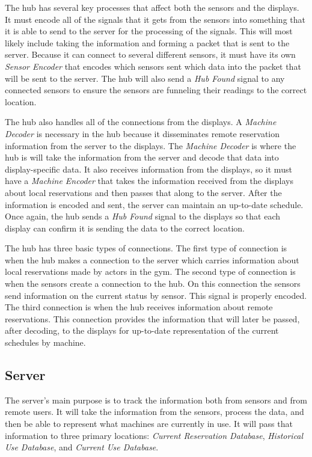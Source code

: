 \documentclass[PPFS.tex]{template/subfiles}
\newcommand{\sn}[1]{\textit{#1}}
\begin{document}
The hub has several key processes that affect both the sensors and the displays. It must encode all of the signals that it gets from the sensors into something that it is able to send to the server for the processing of the signals. This will most likely include taking the information and forming a packet that is sent to the server. Because it can connect to several different sensors, it must have its own \sn{Sensor Encoder} that encodes which sensors sent which data into the packet that will be sent to the server. The hub will also send a \sn{Hub Found} signal to any connected sensors to ensure the sensors are funneling their readings to the correct location.

The hub also handles all of the connections from the displays. A \sn{Machine Decoder} is necessary in the hub because it disseminates remote reservation information from the server to the displays. The \sn{Machine Decoder} is where the hub is will take the information from the server and decode that data into display-specific data. It also receives information from the displays, so it must have a \sn{Machine Encoder} that takes the information received from the displays about local reservations and then passes that along to the server. After the information is encoded and sent, the server can maintain an up-to-date schedule. Once again, the hub sends a \sn{Hub Found} signal to the displays so that each display can confirm it is sending the data to the correct location.

The hub has three basic types of connections. The first type of connection is when the hub makes a connection to the server which carries information about local reservations made by actors in the gym. The second type of connection is when the sensors create a connection to the hub. On this connection the sensors send information on the current status by sensor. This signal is properly encoded. The third connection is when the hub receives information about remote reservations. This connection provides the information that will later be passed, after decoding, to the displays for up-to-date representation of the current schedules by machine.

\subsection{Server}

The server's main purpose is to track the information both from sensors and from remote users. It will take the information from the sensors, process the data, and then be able to represent what machines are currently in use. It will pass that information to three primary locations: \sn{Current Reservation Database}, \sn{Historical Use Database}, and \sn{Current Use Database}.
\end{document}

